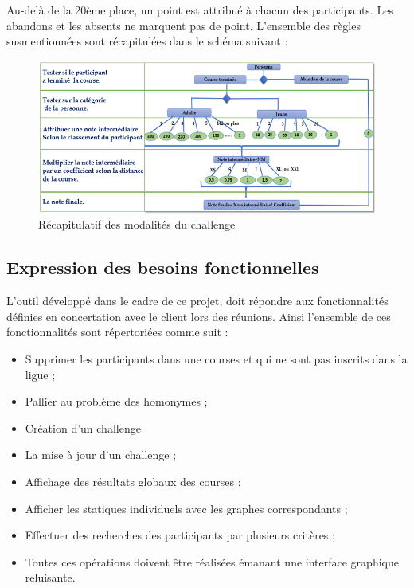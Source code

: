 \documentclass[12pt,a4paper]{report}
\begin{document}
	\newpage
	Au-delà de la 20ème place, un point est attribué à chacun des participants. Les abandons et les absents ne marquent pas de point. 
	L’ensemble des règles susmentionnées sont récapitulées dans le schéma suivant :
	\begin{figure}[!h]
	   \center
	   \includegraphics[scale=0.9]{img/recapitulatif_modalite_challenge.png}
	   \caption {Récapitulatif des modalités du challenge}
	\end{figure}
	
	\newpage
	\subsection{Expression des besoins fonctionnelles}
	L’outil développé dans le cadre de ce projet, doit répondre aux fonctionnalités définies en concertation avec le client lors des réunions. Ainsi l’ensemble de ces fonctionnalités sont répertoriées comme suit :
	\begin{itemize} 
	\item Supprimer les participants dans une courses et qui ne sont pas inscrits dans la ligue ;	
	\item Pallier au problème des homonymes ;
	\item Création d’un challenge
	\item La mise à jour d’un challenge ;
	\item Affichage des résultats globaux des courses ;
	\item Afficher les statiques individuels avec les graphes correspondants ;
	\item Effectuer des recherches des participants par plusieurs critères ;
	\item Toutes ces opérations doivent être réalisées émanant une interface graphique reluisante.
	\end{itemize} 
	
\end{document}
